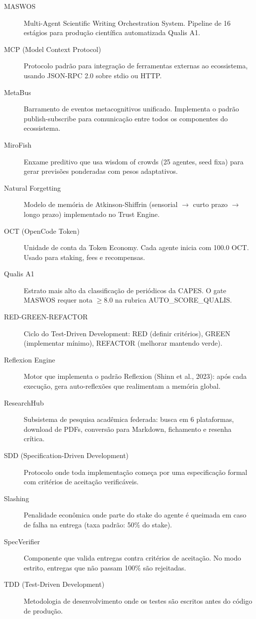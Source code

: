 \begin{description}
  \item[MASWOS] Multi-Agent Scientific Writing Orchestration System. Pipeline de 16 estágios para produção científica automatizada Qualis A1.
  
  \item[MCP (Model Context Protocol)] Protocolo padrão para integração de ferramentas externas ao ecossistema, usando JSON-RPC 2.0 sobre stdio ou HTTP.
  
  \item[MetaBus] Barramento de eventos metacognitivos unificado. Implementa o padrão publish-subscribe para comunicação entre todos os componentes do ecossistema.
  
  \item[MiroFish] Enxame preditivo que usa wisdom of crowds (25 agentes, seed fixa) para gerar previsões ponderadas com pesos adaptativos.
  
  \item[Natural Forgetting] Modelo de memória de Atkinson-Shiffrin (sensorial $\to$ curto prazo $\to$ longo prazo) implementado no Trust Engine.
  
  \item[OCT (OpenCode Token)] Unidade de conta da Token Economy. Cada agente inicia com 100.0 OCT. Usado para staking, fees e recompensas.
  
  \item[Qualis A1] Estrato mais alto da classificação de periódicos da CAPES. O gate MASWOS requer nota $\ge 8.0$ na rubrica AUTO\_SCORE\_QUALIS.
  
  \item[RED-GREEN-REFACTOR] Ciclo do Test-Driven Development: RED (definir critérios), GREEN (implementar mínimo), REFACTOR (melhorar mantendo verde).
  
  \item[Reflexion Engine] Motor que implementa o padrão Reflexion (Shinn et al., 2023): após cada execução, gera auto-reflexões que realimentam a memória global.
  
  \item[ResearchHub] Subsistema de pesquisa acadêmica federada: busca em 6 plataformas, download de PDFs, conversão para Markdown, fichamento e resenha crítica.
  
  \item[SDD (Specification-Driven Development)] Protocolo onde toda implementação começa por uma especificação formal com critérios de aceitação verificáveis.
  
  \item[Slashing] Penalidade econômica onde parte do stake do agente é queimada em caso de falha na entrega (taxa padrão: 50\% do stake).
  
  \item[SpecVerifier] Componente que valida entregas contra critérios de aceitação. No modo estrito, entregas que não passam 100\% são rejeitadas.
  
  \item[TDD (Test-Driven Development)] Metodologia de desenvolvimento onde os testes são escritos antes do código de produção.
\end{description}

